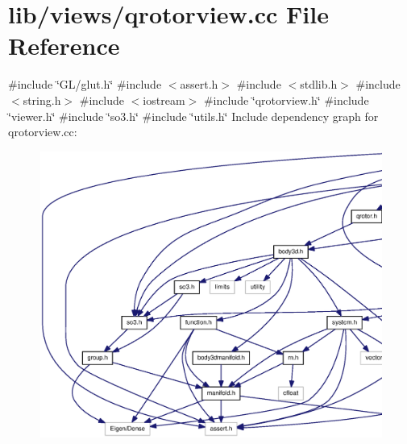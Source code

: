 \section{lib/views/qrotorview.cc \-File \-Reference}
\label{qrotorview_8cc}
{\ttfamily \#include \char`\"{}\-G\-L/glut.\-h\char`\"{}}\*
{\ttfamily \#include $<$assert.\-h$>$}\*
{\ttfamily \#include $<$stdlib.\-h$>$}\*
{\ttfamily \#include $<$string.\-h$>$}\*
{\ttfamily \#include $<$iostream$>$}\*
{\ttfamily \#include \char`\"{}qrotorview.\-h\char`\"{}}\*
{\ttfamily \#include \char`\"{}viewer.\-h\char`\"{}}\*
{\ttfamily \#include \char`\"{}so3.\-h\char`\"{}}\*
{\ttfamily \#include \char`\"{}utils.\-h\char`\"{}}\*
\-Include dependency graph for qrotorview.\-cc\-:
\nopagebreak
\begin{figure}[H]
\begin{center}
\leavevmode
\includegraphics[width=350pt]{qrotorview_8cc__incl}
\end{center}
\end{figure}

